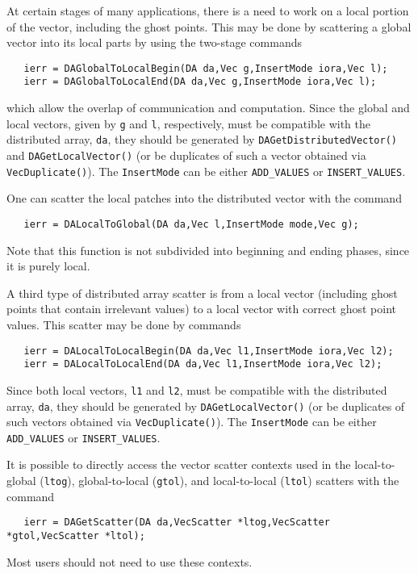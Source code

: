 At certain stages of many applications, there is a need to work 
on a local portion of the vector, including the ghost points. 
This may be done by scattering a global vector into its 
local parts by using the two-stage commands
\begin{verbatim}
   ierr = DAGlobalToLocalBegin(DA da,Vec g,InsertMode iora,Vec l);
   ierr = DAGlobalToLocalEnd(DA da,Vec g,InsertMode iora,Vec l);
\end{verbatim}
which allow the overlap of communication and computation.
  
Since the global and local vectors, given by {\tt g} and {\tt l}, respectively,
must be compatible with the distributed array, {\tt da}, they should be
generated by {\tt DAGetDistributedVector()} 
 and {\tt DAGetLocalVector()}
(or be duplicates of such a vector obtained via {\tt VecDuplicate()}).
The {\tt InsertMode} can be either {\tt ADD\_VALUES} or {\tt INSERT\_VALUES}.

One can scatter the local patches into the distributed vector
with the command 
\begin{verbatim}
   ierr = DALocalToGlobal(DA da,Vec l,InsertMode mode,Vec g);
\end{verbatim}
Note that this function is not
subdivided into beginning and ending phases, since it is purely local.

A third type of distributed array scatter is from a local
vector (including ghost points that contain irrelevant values) to 
a local vector with correct ghost point values. 
This scatter may be done by 
commands 
\begin{verbatim}
   ierr = DALocalToLocalBegin(DA da,Vec l1,InsertMode iora,Vec l2);
   ierr = DALocalToLocalEnd(DA da,Vec l1,InsertMode iora,Vec l2);
\end{verbatim}
Since both local vectors, {\tt l1} and {\tt l2},
must be compatible with the distributed array, {\tt da}, they should be
generated by {\tt DAGetLocalVector()} 
(or be duplicates of such vectors obtained via {\tt VecDuplicate()}).
The {\tt InsertMode} can be either {\tt ADD\_VALUES} or {\tt INSERT\_VALUES}.

It is possible to directly access the vector scatter contexts 
used in the local-to-global ({\tt ltog}), global-to-local 
({\tt gtol}), and local-to-local ({\tt ltol})
scatters with the command 
\begin{verbatim}
   ierr = DAGetScatter(DA da,VecScatter *ltog,VecScatter *gtol,VecScatter *ltol);
\end{verbatim}
Most users should not need to use these contexts.

